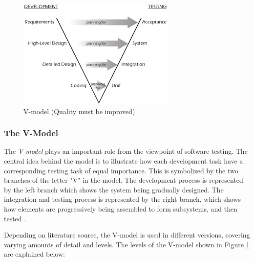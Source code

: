 \begin{figure}[h]
    \centering
    \includegraphics{figures/fig131_02}
    \caption{V-model \cite{http://flylib.com/books/en/2.174.1.22/1/} (Quality must be improved)}
    \label{fig.v-model}
\end{figure}

\subsubsection{The V-Model}

\noindent The \emph{V-model} plays an important role from the viewpoint of software testing. The central idea behind the model is to illustrate how each development task have a corresponding testing task of equal importance. This is symbolized by the two branches of the letter "V" in the model. The development process is represented by the left branch which shows the system being gradually designed. The integration and testing process is represented by the right branch, which shows how elements are progressively being assembled to form subsystems, and then tested \cite{SoftwareTestingFoundations}.

Depending on literature source, the V-model is used in different versions, covering varying amounts of detail and levels. The levels of the V-model shown in Figure \ref{fig.v-model} are explained below:

